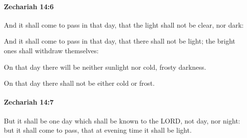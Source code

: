 		\paragraph{Zechariah 14:6} %
			\label{ZECHARIAH-14-6}

			And it shall come to pass in that day, that the light shall not be clear, nor dark:

			\begin{versebox}
					\item[BHS] 
					\item[LXX] 
					\item[ASV] And it shall come to pass in that day, that there shall not be light; the bright ones shall withdraw themselves:
					\item[NIV] On that day there will be neither sunlight nor cold, frosty darkness.
					\item[NRSV] On that day there shall not be either cold or frost.
			\end{versebox}

		\paragraph{Zechariah 14:7} %
			\label{ZECHARIAH-14-7}

			But it shall be one day which shall be known to the LORD, not day, nor night: but it shall come to pass, that at evening time it shall be light.

